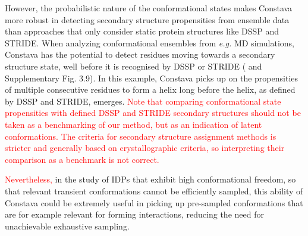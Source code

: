 


However, the probabilistic nature of the conformational states makes Constava more robust in detecting secondary structure propensities from ensemble data than approaches that only consider static protein structures like  DSSP and STRIDE. When analyzing conformational ensembles from \textit{e.g.} MD simulations, Constava has the potential to detect residues moving towards a secondary structure state, well before it is recognised by DSSP or STRIDE ( and Supplementary Fig. 3.9).
In this example, Constava picks up on the propensities of multiple consecutive residues to form a helix long before the helix, as defined by DSSP and STRIDE, emerges. \textcolor{red}{Note that comparing conformational state propensities with defined DSSP and STRIDE secondary structures should not be taken as a benchmarking of our method, but as an indication of latent conformations. The criteria for secondary structure assignment methods is stricter and generally based on crystallographic criteria, so interpreting their comparison as a benchmark is not correct.}

\textcolor{red}{Nevertheless,} in the study of IDPs that exhibit high conformational freedom, so that relevant transient conformations cannot be efficiently sampled, this ability of Constava could be extremely useful in picking up pre-sampled conformations that are for example relevant for forming interactions, reducing the need for unachievable exhaustive sampling. 

